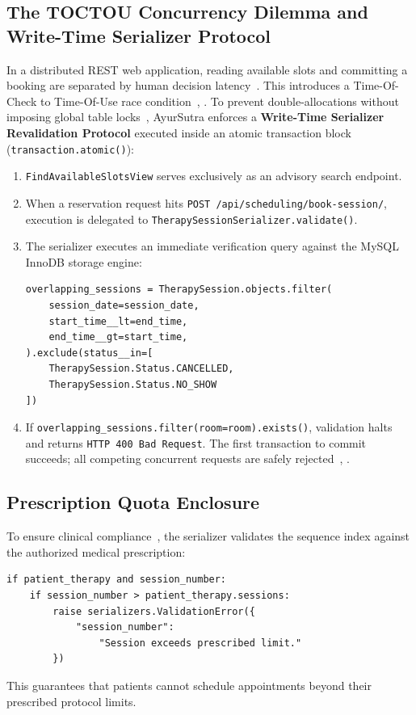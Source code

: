 \documentclass[conference]{IEEEtran}
\begin{document}
\subsection{The TOCTOU Concurrency Dilemma and Write-Time Serializer Protocol}
In a distributed REST web application, reading available slots and committing a booking are separated by human decision latency~\cite{fielding2000architectural}. This introduces a Time-Of-Check to Time-Of-Use race condition~\cite{bishop1996checking}, \cite{panda2022concurrency}. To prevent double-allocations without imposing global table locks~\cite{panda2022concurrency}, AyurSutra enforces a \textbf{Write-Time Serializer Revalidation Protocol} executed inside an atomic transaction block (\texttt{transaction.atomic()}):
\begin{enumerate}
    \item \texttt{FindAvailableSlotsView} serves exclusively as an advisory search endpoint.
    \item When a reservation request hits \texttt{POST /api/scheduling/book-session/}, execution is delegated to \texttt{TherapySessionSerializer.validate()}.
    \item The serializer executes an immediate verification query against the MySQL InnoDB storage engine:
\begin{verbatim}
overlapping_sessions = TherapySession.objects.filter(
    session_date=session_date,
    start_time__lt=end_time,
    end_time__gt=start_time,
).exclude(status__in=[
    TherapySession.Status.CANCELLED, 
    TherapySession.Status.NO_SHOW
])
\end{verbatim}
    \item If \texttt{overlapping\_sessions.filter(room=room).exists()}, validation halts and returns \texttt{HTTP 400 Bad Request}. The first transaction to commit succeeds; all competing concurrent requests are safely rejected~\cite{bishop1996checking}, \cite{panda2022concurrency}.
\end{enumerate}

\subsection{Prescription Quota Enclosure}
To ensure clinical compliance~\cite{singh2008holistic}, the serializer validates the sequence index against the authorized medical prescription:
\begin{verbatim}
if patient_therapy and session_number:
    if session_number > patient_therapy.sessions:
        raise serializers.ValidationError({
            "session_number": 
                "Session exceeds prescribed limit."
        })
\end{verbatim}
This guarantees that patients cannot schedule appointments beyond their prescribed protocol limits.
\end{document}
